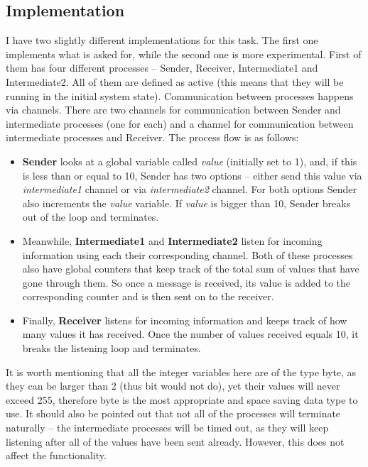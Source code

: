 \documentclass{report}
\newcommand{\tab}{\hspace*{3em}}
\begin{document}
\subsection*{Implementation}
\tab I have two slightly different implementations for this task. The first one implements what is asked for, while the second one is more experimental. First of them has four different processes -- Sender, Receiver, Intermediate1 and Intermediate2. All of them are defined as active (this means that they will be running in the initial system state). Communication between processes happens via channels. There are two channels for communication between Sender and intermediate processes (one for each) and a channel for communication between intermediate processes and Receiver. The process flow is as follows: 
\begin{itemize}
\item \textbf{Sender} looks at a global variable called \textit{value} (initially set to 1), and, if this is less than or equal to 10, Sender has two options -- either send this value via \textit{intermediate1} channel or via \textit{intermediate2} channel. For both options Sender also increments the \textit{value} variable. If \textit{value} is bigger than 10, Sender breaks out of the loop and terminates.
\item Meanwhile, \textbf{Intermediate1} and \textbf{Intermediate2} listen for incoming information using each their corresponding channel. Both of these processes also have global counters that keep track of the total sum of values that have gone through them. So once a message is received, its value is added to the corresponding counter and is then sent on to the receiver.
\item Finally, \textbf{Receiver} listens for incoming information and keeps track of how many values it has received. Once the number of values received equals 10, it breaks the listening loop and terminates.
\end{itemize}
\tab It is worth mentioning that all the integer variables here are of the type byte, as they can be larger than 2 (thus bit would not do), yet their values will never exceed 255, therefore byte is the most appropriate and space saving data type to use. It should also be pointed out that not all of the processes will terminate naturally -- the intermediate processes will be timed out, as they will keep listening after all of the values have been sent already. However, this does not affect the functionality.
\end{document}
